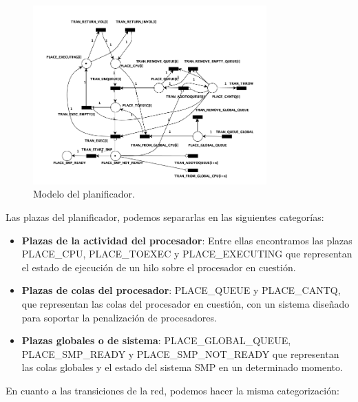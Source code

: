 \begin{figure}[h]
    \centering
    \includegraphics[width=0.8\textwidth]{images/Resource_1CPU.png}
    \caption{Modelo del planificador.}
    \label{fig:schedulerModel}
\end{figure}

Las plazas del planificador, podemos separarlas en las siguientes categorías:

\begin{itemize}
    \item \textbf{Plazas de la actividad del procesador}: Entre ellas encontramos las plazas PLACE\_CPU, PLACE\_TOEXEC y PLACE\_EXECUTING que representan el estado de ejecución de un hilo sobre el procesador en cuestión.
    \item \textbf{Plazas de colas del procesador}: PLACE\_QUEUE y PLACE\_CANTQ, que representan las colas del procesador en cuestión, con un sistema diseñado para soportar la penalización de procesadores.
    \item \textbf{Plazas globales o de sistema}: PLACE\_GLOBAL\_QUEUE, PLACE\_SMP\_READY y PLACE\_SMP\_NOT\_READY que representan las colas globales y el estado del sistema SMP en un determinado momento.
\end{itemize}

En cuanto a las transiciones de la red, podemos hacer la misma categorización:

